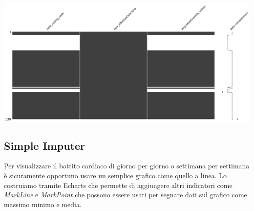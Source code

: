 \documentclass[11pt, oneside]{article}
\begin{document}
\begin{center}
\includegraphics[scale=0.2]{2_msn_df2.png}
\end{center}

\subsection{Simple Imputer}

Per visualizzare il battito cardiaco di giorno per giorno o settimana per settimana è sicuramente opportuno usare un semplice grafico come quello a linea. Lo costruiamo tramite Echarts che permette di aggiungere altri indicatori come \emph{MarkLine} e \emph{MarkPoint} che possono essere usati per segnare dati sul grafico come massimo minimo e media.
\end{document}
